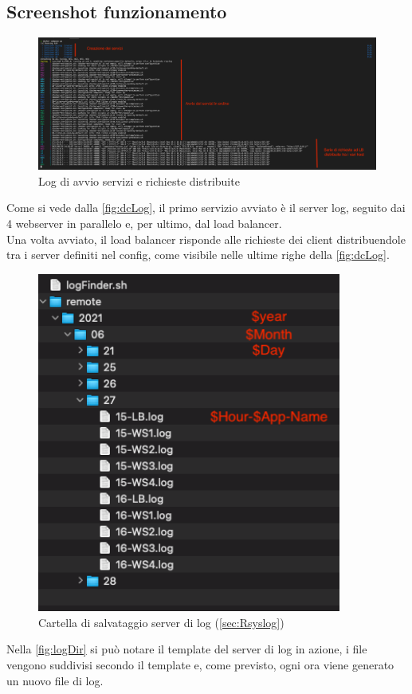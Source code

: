 \documentclass[../DocumentazioneProgetto.tex]{subfiles}
\begin{document}
	\subsection{Screenshot funzionamento} 
	\begin{figure}[ht]
		\includegraphics[width=15cm]{images/dcLog.png}
		\centering
		\caption{Log di avvio servizi e richieste distribuite}
		\label{fig:dcLog}
	\end{figure}
	Come si vede dalla \autoref{fig:dcLog}, il primo servizio avviato è il server log, seguito dai 4 webserver in parallelo e, per ultimo, dal load balancer.\\
	Una volta avviato, il load balancer risponde alle richieste dei client distribuendole tra i server definiti nel config, come visibile nelle ultime righe della \autoref{fig:dcLog}.

	\begin{figure}[ht]
		\includegraphics[width=10cm]{images/logDir.png}
		\centering
		\caption{Cartella di salvataggio server di log (\autoref{sec:Rsyslog})}
		\label{fig:logDir}
	\end{figure}
	Nella \autoref{fig:logDir} si può notare il template del server di log in azione, i file vengono suddivisi secondo il template e, come previsto, ogni ora viene generato un nuovo file di log.
\end{document}
